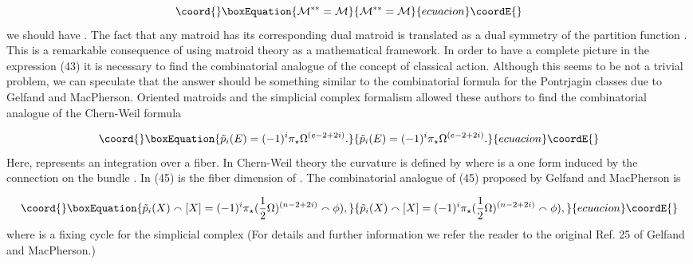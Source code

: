 \documentclass[a4paper,12pt]{article}
\begin{document}
\begin{equation}\coord{}\boxEquation{
\mathcal{M}^{\ast \ast }=\mathcal{M}  \label{44}
}{
\mathcal{M}^{\ast \ast }=\mathcal{M}  }{ecuacion}\coordE{}\end{equation}
we should have \coordHE{}. The fact that any
matroid has its corresponding dual matroid is translated as a dual symmetry
of the partition function \coordHE{}.
This is a remarkable consequence of using matroid theory as a mathematical
framework. In order to have a complete picture in the expression (43) it is
necessary to find the combinatorial analogue of the concept of classical
action. Although this seems to be not a trivial problem, we can speculate
that the answer should be something similar to the combinatorial formula for
the Pontrjagin classes due to Gelfand and MacPherson.\coordHE{} Oriented
matroids and the simplicial complex formalism allowed these authors to find
the combinatorial analogue of the Chern-Weil formula

\begin{equation}\coord{}\boxEquation{
\tilde{p}_{i}(E)=(-1)^{i}\pi _{\star }\Omega ^{(e-2+2i)}.  \label{45}
}{
\tilde{p}_{i}(E)=(-1)^{i}\pi _{\star }\Omega ^{(e-2+2i)}.  }{ecuacion}\coordE{}\end{equation}
Here, \myHighlight{$\pi _{\star }$}\coordHE{} represents an integration over a fiber. In Chern-Weil
theory the curvature is defined by \coordHE{} where \myHighlight{$%
\Theta $}\coordHE{} is a one form induced by the connection on the bundle \coordHE{}. In (45) \coordHE{} is the fiber dimension of \coordHE{}. The combinatorial analogue of (45)
proposed by Gelfand and MacPherson is

\begin{equation}\coord{}\boxEquation{
\tilde{p}_{i}(X)\smallfrown \lbrack X]=(-1)^{i}\pi _{\star }(\frac{1}{2}
\Omega )^{(n-2+2i)}\smallfrown \phi ),  \label{46}
}{
\tilde{p}_{i}(X)\smallfrown \lbrack X]=(-1)^{i}\pi _{\star }(\frac{1}{2}
\Omega )^{(n-2+2i)}\smallfrown \phi ),  }{ecuacion}\coordE{}\end{equation}
where \myHighlight{$\phi $}\coordHE{} is a fixing cycle for the simplicial complex \coordHE{} (For details
and further information we refer the reader to the original Ref. 25 of
Gelfand and MacPherson.)
\end{document}
